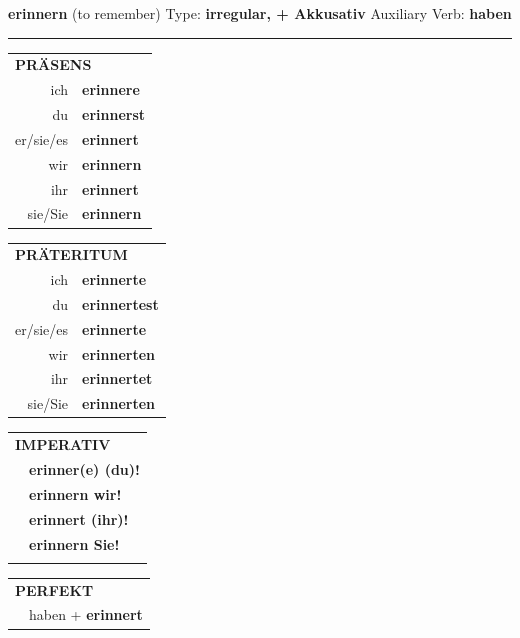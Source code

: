 \documentclass[10pt,a4paper]{revtex4-2}
\begin{document}
\begin{verbbox-acc}
    {\Large \bf erinnern} (to remember) \hfill Type: \textbf{irregular, + Akkusativ} \hfill Auxiliary Verb: \textbf{haben} 
    
     \vspace{5pt}

    \hrule
    
    \vspace{5pt}

  \begin{tabular}{rl}
     \multicolumn{2}{l}{\textbf{PRÄSENS} }\\
    ich & \textbf{erinnere}\\
    du & \textbf{erinnerst}\\
    er/sie/es & \textbf{erinnert}\\
    wir & \textbf{erinnern}\\
    ihr & \textbf{erinnert}\\
    sie/Sie & \textbf{erinnern}\\
  \end{tabular}
  \hfill
     \begin{tabular}{rl}
    \multicolumn{2}{l}{\textbf{PRÄTERITUM} }\\
    ich & \textbf{erinnerte}\\
    du & \textbf{erinnertest}\\
    er/sie/es & \textbf{erinnerte}\\
    wir & \textbf{erinnerten}\\
    ihr & \textbf{erinnertet}\\
    sie/Sie & \textbf{erinnerten}\\
  \end{tabular}
  \hfill
  \begin{tabular}{rl}
     \multicolumn{2}{l}{\textbf{IMPERATIV} }\\
   & \textbf{erinner(e) (du)!}\\
   & \textbf{erinnern wir!}\\
   & \textbf{erinnert (ihr)!}\\
   & \textbf{erinnern Sie!}\\
   & \vspace{10pt}
  \end{tabular}

    \vspace{10pt}

 \begin{tabular}{rl}
     \multicolumn{2}{l}{\textbf{PERFEKT}}\\
   & haben + \textbf{erinnert}\\
  \end{tabular}
\hfill
   \begin{tabular}{rl}
   

\end{tabular}
\end{verbbox-acc}
\end{document}
